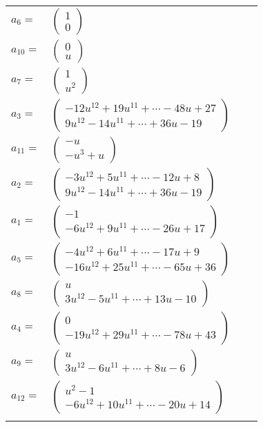 \documentclass[1p]{elsarticle_modified}
\theoremstyle{definition}
\begin{document}
\begin{tabular}{m{7pt} m{180pt} m{7pt} m{180pt} }
\flushright $a_{6}=$&$\begin{pmatrix}1\\0\end{pmatrix}$ \\
\flushright $a_{10}=$&$\begin{pmatrix}0\\u\end{pmatrix}$ \\
\flushright $a_{7}=$&$\begin{pmatrix}1\\u^2\end{pmatrix}$ \\
\flushright $a_{3}=$&$\begin{pmatrix}-12 u^{12}+19 u^{11}+\cdots-48 u+27\\9 u^{12}-14 u^{11}+\cdots+36 u-19\end{pmatrix}$ \\
\flushright $a_{11}=$&$\begin{pmatrix}- u\\- u^3+u\end{pmatrix}$ \\
\flushright $a_{2}=$&$\begin{pmatrix}-3 u^{12}+5 u^{11}+\cdots-12 u+8\\9 u^{12}-14 u^{11}+\cdots+36 u-19\end{pmatrix}$ \\
\flushright $a_{1}=$&$\begin{pmatrix}-1\\-6 u^{12}+9 u^{11}+\cdots-26 u+17\end{pmatrix}$ \\
\flushright $a_{5}=$&$\begin{pmatrix}-4 u^{12}+6 u^{11}+\cdots-17 u+9\\-16 u^{12}+25 u^{11}+\cdots-65 u+36\end{pmatrix}$ \\
\flushright $a_{8}=$&$\begin{pmatrix}u\\3 u^{12}-5 u^{11}+\cdots+13 u-10\end{pmatrix}$ \\
\flushright $a_{4}=$&$\begin{pmatrix}0\\-19 u^{12}+29 u^{11}+\cdots-78 u+43\end{pmatrix}$ \\
\flushright $a_{9}=$&$\begin{pmatrix}u\\3 u^{12}-6 u^{11}+\cdots+8 u-6\end{pmatrix}$ \\
\flushright $a_{12}=$&$\begin{pmatrix}u^2-1\\-6 u^{12}+10 u^{11}+\cdots-20 u+14\end{pmatrix}$\\&\end{tabular}
\end{document}
